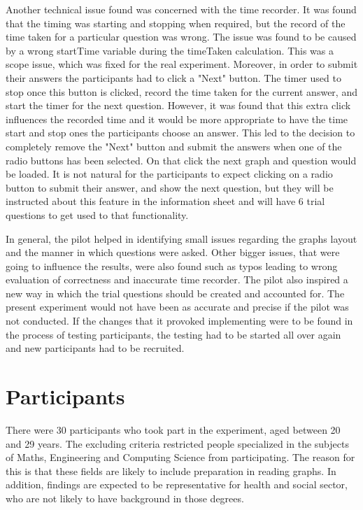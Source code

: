 \documentclass{l4proj}
\begin{document}
Another technical issue found was concerned with the time recorder. It was found that the timing was starting and stopping when required, but the record of the time taken for a particular question was wrong. The issue was found to be caused by a wrong startTime variable during the timeTaken calculation. This was a scope issue, which was fixed for the real experiment. Moreover, in order to submit their answers the participants had to click a "Next" button. The timer used to stop once this button is clicked, record the time taken for the current answer, and start the timer for the next question. However, it was found that this extra click influences the recorded time and it would be more appropriate to have the time start and stop ones the participants choose an answer. This led to the decision to completely remove the "Next" button and submit the answers when one of the radio buttons has been selected. On that click the next graph and question would be loaded. It is not natural for the participants to expect clicking on a radio button to submit their answer, and show the next question, but they will be instructed about this feature in the information sheet and will have 6 trial questions to get used to that functionality. 
 
In general, the pilot helped in identifying small issues regarding the graphs layout and the manner in which questions were asked. Other bigger issues, that were going to influence the results, were also found such as typos leading to wrong evaluation of correctness and inaccurate time recorder. The pilot also inspired a new way in which the trial questions should be created and accounted for. The present experiment would not have been as accurate and precise if the pilot was not conducted. If the changes that it provoked implementing were to be found in the process of testing participants, the testing had to be started all over again and new participants had to be recruited.

\section{Participants}
There were 30 participants who took part in the experiment, aged between 20 and 29 years. The excluding criteria restricted people specialized in the subjects of Maths, Engineering and Computing Science from participating. The reason for this is that these fields are likely to include preparation in reading graphs. In addition, findings are expected to be representative for health and social sector, who are not likely to have background in those degrees.
\end{document}
